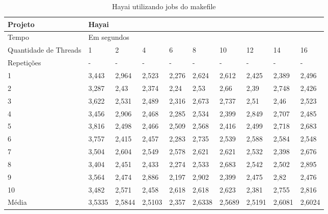 \begin{table}[h]
\centering
\begin{tabular}{|p{1cm}|p{1.4cm}|p{1.4cm}|p{1.4cm}|p{1.4cm}|p{1.4cm}|p{1.4cm}|p{1.4cm}|p{1.4cm}|p{1.4cm}|}
\hline
Projeto               & \multicolumn{9}{l|}{Hayai}        \\ \hline
Tempo                 & \multicolumn{9}{l|}{Em segundos}      \\ \hline
Quantidade de Threads & 1 & 2 & 4 & 6 & 8 & 10 & 12 & 14 & 16 \\ \hline
Repetições            & - & - & - & - & - & -  & -  & -  & -  \\ \hline
1 & 3,443 & 2,964  & 2,523 &2,276 &2,624    & 2,612   &2,425    &2,389  &2,496  \\ \hline
2 & 3,287 & 2,43   & 2,374 &2,24  &2,53     & 2,66    &2,39     &2,748  &2,426   \\ \hline
3 & 3,622 & 2,531  & 2,489 &2,316 &2,673    & 2,737   &2,51     &2,46   &2,523 \\ \hline
4 & 3,456 & 2,906  & 2,468 &2,285 &2,534    & 2,399   &2,849    &2,707  &2,485 \\ \hline
5 & 3,816 & 2,498  & 2,466 &2,509 &2,568    & 2,416   &2,499    &2,718  &2,683 \\ \hline
6 & 3,757 & 2,415  & 2,457 &2,283 &2,735    & 2,539   &2,588    &2,584  &2,548 \\ \hline
7 & 3,504 & 2,604  & 2,549 &2,578 &2,621    & 2,621   &2,532    &2,398  &2,676 \\ \hline
8 & 3,404 & 2,451  & 2,433 &2,274 &2,533    & 2,683   &2,542    &2,502  &2,895 \\ \hline
9 & 3,564 & 2,474  & 2,886 &2,197 &2,902    & 2,399   &2,475    &2,82   &2,476 \\ \hline
10 & 3,482 & 2,571  & 2,458 &2,618 &2,618    & 2,623   &2,381    &2,755  &2,816 \\ \hline
Média & 3,5335 &  2,5844 & 2,5103 & 2,357 & 2,6338 & 2,5689 & 2,5191 &2,6081 &2,6024 \\ \hline
\end{tabular}
\caption{Hayai utilizando jobs do makefile}
\label{tab:hayai}
\end{table}

